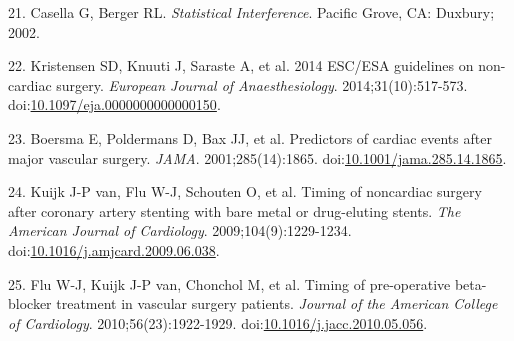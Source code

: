 \documentclass[]{article}
\begin{document}
\hypertarget{ref-casella2002}{}
21. Casella G, Berger RL. \emph{Statistical Interference}. Pacific
Grove, CA: Duxbury; 2002.

\hypertarget{ref-Kristensen_2014}{}
22. Kristensen SD, Knuuti J, Saraste A, et al. 2014 ESC/ESA guidelines
on non-cardiac surgery. \emph{European Journal of Anaesthesiology}.
2014;31(10):517-573.
doi:\href{https://doi.org/10.1097/eja.0000000000000150}{10.1097/eja.0000000000000150}.

\hypertarget{ref-Boersma_2001}{}
23. Boersma E, Poldermans D, Bax JJ, et al. Predictors of cardiac events
after major vascular surgery. \emph{JAMA}. 2001;285(14):1865.
doi:\href{https://doi.org/10.1001/jama.285.14.1865}{10.1001/jama.285.14.1865}.

\hypertarget{ref-van_Kuijk_2009}{}
24. Kuijk J-P van, Flu W-J, Schouten O, et al. Timing of noncardiac
surgery after coronary artery stenting with bare metal or drug-eluting
stents. \emph{The American Journal of Cardiology}.
2009;104(9):1229-1234.
doi:\href{https://doi.org/10.1016/j.amjcard.2009.06.038}{10.1016/j.amjcard.2009.06.038}.

\hypertarget{ref-Flu_2010}{}
25. Flu W-J, Kuijk J-P van, Chonchol M, et al. Timing of pre-operative
beta-blocker treatment in vascular surgery patients. \emph{Journal of
the American College of Cardiology}. 2010;56(23):1922-1929.
doi:\href{https://doi.org/10.1016/j.jacc.2010.05.056}{10.1016/j.jacc.2010.05.056}.
\end{document}
